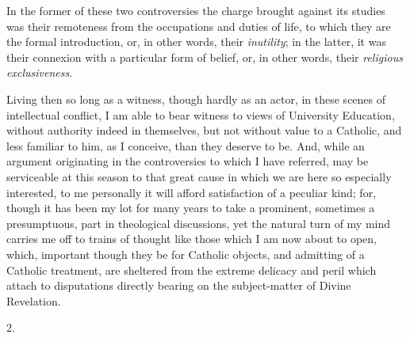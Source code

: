 In the former of these two controversies the charge brought against
its studies was their remoteness from the occupations and duties of
life, to which they are the formal introduction, or, in other words,
their \emph{inutility}; in the latter, it was their connexion with a
particular form of belief, or, in other words, their \emph{religious
exclusiveness}.

Living then so long as a witness, though hardly as an actor, in
these scenes of intellectual conflict, I am able to bear witness
to views of University Education, without authority indeed in
themselves, but not without value to a Catholic, and less familiar to
him, as I conceive, than they deserve to be. And, while an argument
originating in the controversies to which I have referred, may be
serviceable at this season to that great cause in which we are here so
especially interested, to me personally it will afford satisfaction of
a peculiar kind; for, though it has been my lot for many years to take
a prominent, sometimes a presumptuous, part in theological
discussions, yet the natural turn of my mind carries me off to trains
of thought like those which I am now about to open, which, important
though they be for Catholic objects, and admitting of a Catholic
treatment, are sheltered from the extreme delicacy and peril which
attach to disputations directly bearing on the subject-matter of
Divine Revelation.

2.

